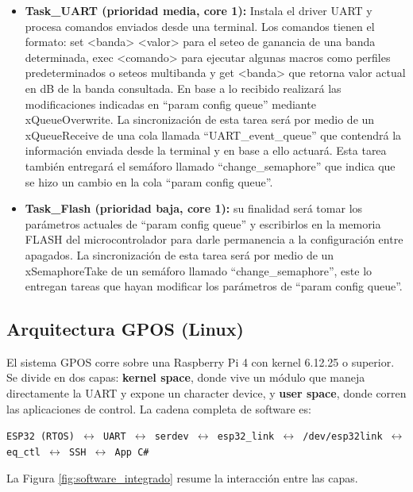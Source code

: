 \documentclass[RT]{UTNLSE}
\begin{document}
\begin{itemize}
    \item \textbf{Task\_UART (prioridad media, core 1):} Instala el driver UART y procesa comandos enviados desde una terminal. Los comandos tienen el formato: set <banda> <valor> para el seteo de ganancia de una banda determinada, exec <comando> para ejecutar algunas macros como perfiles predeterminados o seteos multibanda y get <banda> que retorna valor actual en dB de la banda consultada. En base a lo recibido realizará las modificaciones indicadas en “param config queue” mediante xQueueOverwrite. La sincronización de esta tarea será por medio de un xQueueReceive de una cola llamada “UART\_event\_queue” que contendrá la información enviada desde la terminal y en base a ello actuará. Esta tarea también entregará el semáforo llamado “change\_semaphore” que indica que se hizo un cambio en la cola “param config queue”.
    \item \textbf{Task\_Flash (prioridad baja, core 1):} su finalidad será tomar los parámetros actuales de “param config queue” y escribirlos en la memoria FLASH del microcontrolador para darle permanencia a la configuración entre apagados. La sincronización de esta tarea será por medio de un xSemaphoreTake de un semáforo llamado “change\_semaphore”, este lo entregan tareas que hayan modificar los parámetros de “param config queue”.
\end{itemize}

\subsection{Arquitectura GPOS (Linux)}

El sistema GPOS corre sobre una Raspberry Pi 4 con kernel 6.12.25 o superior. Se divide en dos capas: \textbf{kernel space}, donde vive un módulo que maneja directamente la UART y expone un character device, y \textbf{user space}, donde corren las aplicaciones de control. La cadena completa de software es:

\begin{center}
\texttt{ESP32 (RTOS) $\leftrightarrow$ UART $\leftrightarrow$ serdev $\leftrightarrow$ esp32\_link $\leftrightarrow$ /dev/esp32link $\leftrightarrow$ eq\_ctl $\leftrightarrow$ SSH $\leftrightarrow$ App C\#}
\end{center}

La Figura \ref{fig:software_integrado} resume la interacción entre las capas.
\end{document}
